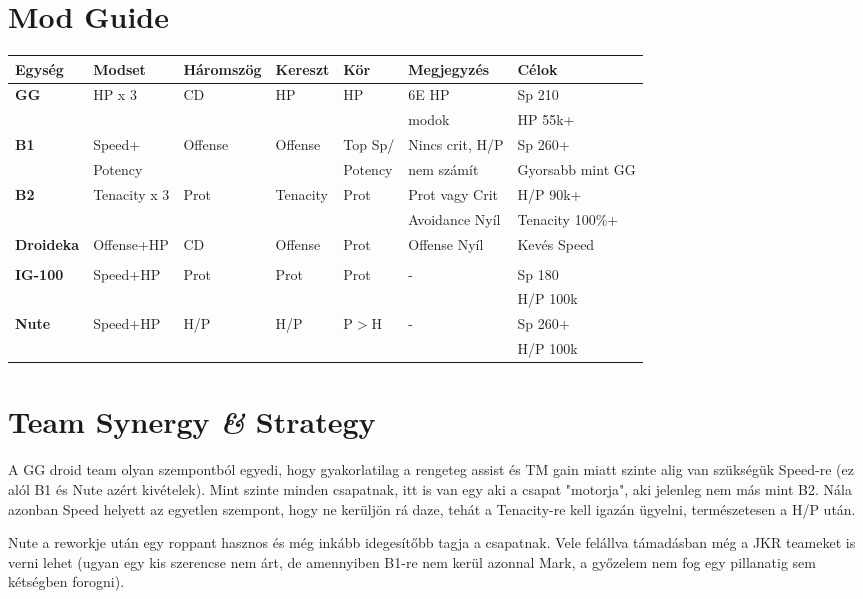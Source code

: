 \documentclass[11pt]{report}
\begin{document}
\section{Mod Guide}
\begin{center}
    \begin{tabular}{|l | l | l | l | l | l | l |}
        \hline
        Egység & Modset & Háromszög & Kereszt & Kör & Megjegyzés & Célok\\ \hline
        \textbf{GG} & HP x 3 & CD & HP & HP & 6E HP & Sp 210\\
        &  &  &  &  & modok & HP 55k+\\ \hline
        \textbf{B1} & Speed+ & Offense & Offense & Top Sp/ & Nincs crit, H/P & Sp 260+\\
        & Potency &  &  & Potency & nem számít & Gyorsabb mint GG\\ \hline
        \textbf{B2} & Tenacity x 3 & Prot & Tenacity & Prot & Prot vagy Crit & H/P 90k+\\
        &  &  &  &  & Avoidance Nyíl & Tenacity 100\%+\\ \hline
        \textbf{Droideka} & Offense+HP & CD & Offense & Prot & Offense Nyíl & Kevés Speed\\
        &  &  &  &  &  & \\ \hline
        \textbf{IG-100} & Speed+HP & Prot & Prot & Prot & - & Sp 180\\
        &  &  &  &  &  & H/P 100k\\ \hline
        \textbf{Nute} & Speed+HP & H/P & H/P & P$>$H & - & Sp 260+\\
        &  &  &  &  &  & H/P 100k\\ \hline
    \end{tabular}
\end{center}
\section{Team Synergy \textit{\&} Strategy}
A GG droid team olyan szempontból egyedi, hogy gyakorlatilag a rengeteg assist és TM gain miatt szinte alig van szükségük Speed-re (ez alól B1 és Nute azért kivételek). Mint szinte minden csapatnak, itt is van egy aki a csapat "motorja", aki jelenleg nem más mint B2. Nála azonban Speed helyett az egyetlen szempont, hogy ne kerüljön rá daze, tehát a Tenacity-re kell igazán ügyelni, természetesen a H/P után.\par
Nute a reworkje után egy roppant hasznos és még inkább idegesítőbb tagja a csapatnak. Vele felállva támadásban még a JKR teameket is verni lehet (ugyan egy kis szerencse nem árt, de amennyiben B1-re nem kerül azonnal Mark, a győzelem nem fog egy pillanatig sem kétségben forogni).
\end{document}
